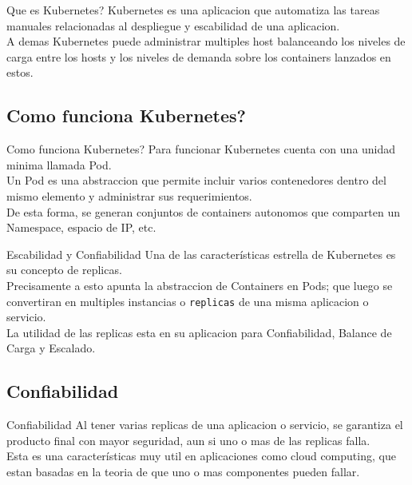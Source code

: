 \documentclass{beamer}
\begin{document}
\begin{frame}{Que es Kubernetes?}
	Kubernetes es una aplicacion que automatiza las tareas manuales relacionadas al despliegue y escabilidad de una aplicacion. \\
	\vspace{.3cm}
	A demas Kubernetes puede administrar multiples host balanceando los niveles de carga entre los hosts y los niveles de demanda
	sobre los containers lanzados en estos. 
\end{frame}


\subsection{Como funciona Kubernetes?}

\begin{frame}{Como funciona Kubernetes?}
	Para funcionar Kubernetes cuenta con una unidad minima llamada Pod. \\
	\vspace{.2cm}
	Un Pod es una abstraccion que permite incluir varios contenedores dentro del mismo elemento y administrar sus requerimientos. \\
	\vspace{.2cm}
	De esta forma, se generan conjuntos de containers autonomos que comparten un Namespace, espacio de IP, etc.
\end{frame}

\begin{frame}{Escabilidad y Confiabilidad}
	Una de las características estrella de Kubernetes es su concepto de replicas. \\
	\vspace{.3cm}
	Precisamente a esto apunta la abstraccion de Containers en Pods; que luego se convertiran en multiples instancias o \texttt{replicas} de una misma aplicacion
	o servicio. \\
	La utilidad de las replicas esta en su aplicacion para Confiabilidad, Balance de Carga y Escalado.
\end{frame}


\subsection{Confiabilidad}

\begin{frame}{Confiabilidad}
	Al tener varias replicas de una aplicacion o servicio, se garantiza el producto final con mayor seguridad, aun si uno o mas de las replicas falla. \\
	\vspace{.3cm}
	Esta es una características muy util en aplicaciones como cloud computing, que estan basadas en la teoria de que uno o mas componentes pueden fallar.
\end{frame}
\end{document}
